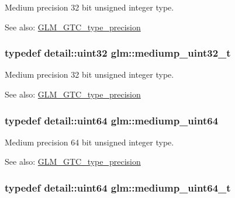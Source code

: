 Medium precision 32 bit unsigned integer type. \begin{Desc}
\item[See also:]\hyperlink{group__gtc__type__precision}{GLM\_\-GTC\_\-type\_\-precision} \end{Desc}
\hypertarget{group__gtc__type__precision_gc7782c1e393f9ad47e41a177a685f287}{
\subsubsection[mediump\_\-uint32\_\-t]{\setlength{\rightskip}{0pt plus 5cm}typedef detail::uint32 {\bf glm::mediump\_\-uint32\_\-t}}}
\label{group__gtc__type__precision_gc7782c1e393f9ad47e41a177a685f287}


Medium precision 32 bit unsigned integer type. \begin{Desc}
\item[See also:]\hyperlink{group__gtc__type__precision}{GLM\_\-GTC\_\-type\_\-precision} \end{Desc}
\hypertarget{group__gtc__type__precision_g6685788d15d0a973ee7c2460d0456dc1}{
\subsubsection[mediump\_\-uint64]{\setlength{\rightskip}{0pt plus 5cm}typedef detail::uint64 {\bf glm::mediump\_\-uint64}}}
\label{group__gtc__type__precision_g6685788d15d0a973ee7c2460d0456dc1}


Medium precision 64 bit unsigned integer type. \begin{Desc}
\item[See also:]\hyperlink{group__gtc__type__precision}{GLM\_\-GTC\_\-type\_\-precision} \end{Desc}
\hypertarget{group__gtc__type__precision_ga97354d3120a6dc029a5e9563723de18}{
\subsubsection[mediump\_\-uint64\_\-t]{\setlength{\rightskip}{0pt plus 5cm}typedef detail::uint64 {\bf glm::mediump\_\-uint64\_\-t}}}
\label{group__gtc__type__precision_ga97354d3120a6dc029a5e9563723de18}


